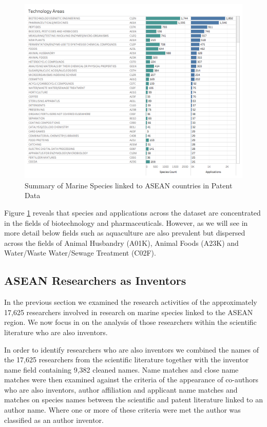 \documentclass[]{book}
\theoremstyle{definition}
\theoremstyle{definition}
\theoremstyle{definition}
\theoremstyle{remark}
\begin{document}
\begin{figure}

{\centering \includegraphics[width=1\linewidth]{images-patents/technology_areas_species} 

}

\caption{Summary of Marine Species linked to ASEAN countries in Patent Data}\label{fig:patentspeciestechnology}
\end{figure}

Figure \ref{fig:patentspeciestechnology} reveals that species and
applications across the dataset are concentrated in the fields of
biotechnology and pharmaceuticals. However, as we will see in more
detail below fields such as aquaculture are also prevalent but dispersed
across the fields of Animal Husbandry (A01K), Animal Foods (A23K) and
Water/Waste Water/Sewage Treatment (C02F).

\hypertarget{asean-researchers-as-inventors}{%
\subsection{ASEAN Researchers as
Inventors}\label{asean-researchers-as-inventors}}

In the previous section we examined the research activities of the
approximately 17,625 researchers involved in research on marine species
linked to the ASEAN region. We now focus in on the analysis of those
researchers within the scientific literature who are also inventors.

In order to identify researchers who are also inventors we combined the
names of the 17,625 researchers from the scientific literature together
with the inventor name field containing 9,382 cleaned names. Name
matches and close name matches were then examined against the criteria
of the appearance of co-authors who are also inventors, author
affiliation and applicant name matches and matches on species names
between the scientific and patent literature linked to an author name.
Where one or more of these criteria were met the author was classified
as an author inventor.
\end{document}
